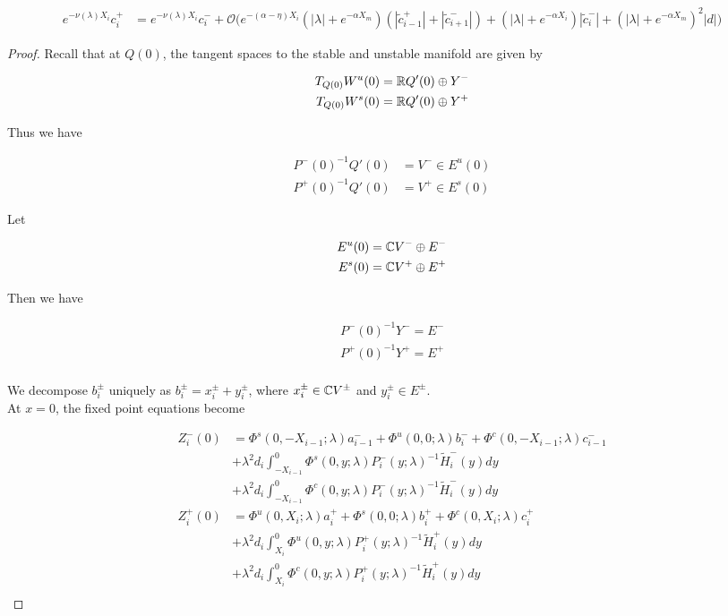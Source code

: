\documentclass[thesis.tex]{subfiles}
\begin{document}
\begin{lemma}
\begin{align}\label{tildecminus}
e^{-\nu(\lambda)X_i} c_i^+
&= e^{-\nu(\lambda)X_i} c_i^- + \mathcal{O}\Big( e^{-(\alpha - \eta)X_i} (|\lambda| + e^{-\alpha X_m})( |\tilde{c}_{i-1}^+| + |\tilde{c}_{i+1}^-|) 
+ (|\lambda|+ e^{-\alpha X_i}) |\tilde{c}_i^-| + ( |\lambda| + e^{-\alpha X_m} )^2 |d| \Big)
\end{align}

\begin{proof}

Recall that at $Q(0)$, the tangent spaces to the stable and unstable manifold are given by

\begin{align*}
T_{Q(0)} W^u(0) &= {\mathbb R} Q'(0) \oplus Y^- \\
T_{Q(0)} W^s(0) &= {\mathbb R} Q'(0) \oplus Y^+
\end{align*}

Thus we have

\begin{align*}
P^-(0)^{-1} Q'(0) &= V^- \in E^u(0) \\
P^+(0)^{-1} Q'(0) &= V^+ \in E^s(0)
\end{align*}

Let

\begin{align*}
E^u(0) &= {\mathbb C} V^- \oplus E^- \\
E^s(0) &= {\mathbb C} V^+ \oplus E^+ \\
\end{align*}

Then we have

\begin{align*}
P^-(0)^{-1} Y^- = E^- \\
P^+(0)^{-1} Y^+ = E^+ \\
\end{align*}

We decompose $b_i^\pm$ uniquely as $b_i^\pm = x_i^\pm + y_i^\pm$, where $x_i^\pm \in {\mathbb C} V^\pm$ and $y_i^\pm \in E^\pm$.\\

At $x = 0$, the fixed point equations become

\begin{align*}
Z_i^-(0) &= \Phi^s(0, -X_{i-1}; \lambda) a_{i-1}^- + \Phi^u(0, 0; \lambda) b_i^- + \Phi^c(0, -X_{i-1}; \lambda) c_{i-1}^- \\
&+ \lambda^2 d_i \int_{-X_{i-1}}^0 \Phi^s(0, y; \lambda) P_i^-(y; \lambda)^{-1} \tilde{H}_i^-(y) dy \\
&+ \lambda^2 d_i \int_{-X_{i-1}}^0 \Phi^c(0, y; \lambda) P_i^-(y; \lambda)^{-1} \tilde{H}_i^-(y) dy  \\ 
Z_i^+(0) &= \Phi^u(0, X_i; \lambda) a_i^+ + \Phi^s(0, 0; \lambda) b_i^+ + \Phi^c(0, X_i; \lambda) c_i^+ \\
&+ \lambda^2 d_i \int_{X_i}^0 \Phi^u(0, y; \lambda) P_i^+(y; \lambda)^{-1} \tilde{H}_i^+(y) dy \\
&+ \lambda^2 d_i \int_{X_i}^0 \Phi^c(0, y; \lambda) P_i^+(y; \lambda)^{-1} \tilde{H}_i^+(y) dy \\
\end{align*}


\end{proof}
\end{lemma}
\end{document}
